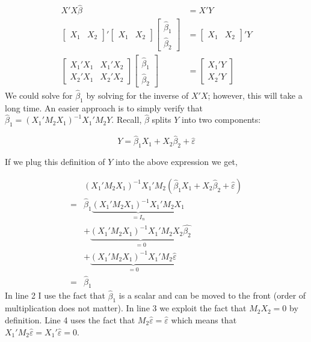 \documentclass[
  letterpaper,
  DIV=11,
  numbers=noendperiod]{scrreprt}
\begin{document}
\[
\begin{align}
X'X\hat{\beta} &= X'Y \\
\begin{bmatrix}X_1 & X_2\end{bmatrix}'\begin{bmatrix}X_1 & X_2\end{bmatrix}\begin{bmatrix}\hat{\beta}_1 \\ \hat{\beta}_2\end{bmatrix} &= \begin{bmatrix}X_1 & X_2\end{bmatrix}'Y \\
\begin{bmatrix}X_1'X_1 & X_1'X_2 \\ X_2'X_1 & X_2'X_2 \end{bmatrix}\begin{bmatrix}\hat{\beta}_1 \\ \hat{\beta}_2\end{bmatrix} &= \begin{bmatrix}X_1'Y \\ X_2'Y\end{bmatrix}
\end{align}
\] We could solve for \(\hat{\beta}_1\) by solving for the inverse of
\(X'X\); however, this will take a long time. An easier approach is to
simply verify that \(\hat{\beta}_1=(X_1'M_2X_1)^{-1}X_1'M_2Y\). Recall,
\(\hat{\beta}\) splits \(Y\) into two components:

\[
Y = \hat{\beta}_1X_1+X_2\hat{\beta}_2 + \hat{\varepsilon}
\]

If we plug this definition of \(Y\) into the above expression we get,

\[
\begin{align}
&(X_1'M_2X_1)^{-1}X_1'M_2(\hat{\beta}_1X_1+X_2\hat{\beta}_2 + \hat{\varepsilon}) \\
=&\hat{\beta}_1\underbrace{(X_1'M_2X_1)^{-1}X_1'M_2X_1}_{=I_n} \\
&+\underbrace{(X_1'M_2X_1)^{-1}X_1'M_2X_2\hat{\beta_2}}_{=0} \\
&+\underbrace{(X_1'M_2X_1)^{-1}X_1'M_2\hat{\varepsilon}}_{=0} \\
=&\hat{\beta}_1
\end{align}
\] In line 2 I use the fact that \(\hat{\beta}_1\) is a scalar and can
be moved to the front (order of multiplication does not matter). In line
3 we exploit the fact that \(M_2X_2=0\) by definition. Line 4 uses the
fact that \(M_2\hat{\varepsilon}=\hat{\varepsilon}\) which means that
\(X_1'M_2\hat{\varepsilon}=X_1'\hat{\varepsilon}=0\).
\end{document}
